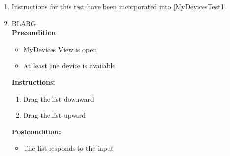 \documentclass[a4paper]{article}
\newlength{\testlabellength}
\newenvironment{testlist}{\begin{enumerate}[label=\bfseries Instruction \thesubsection.\arabic* , labelindent=0pt, labelwidth=\testlabellength , leftmargin=2cm]}{\end{enumerate}}
\newenvironment{precondition}{
{\color{white}BLARG}\\ 
\textbf{Precondition}
\begin{itemize}[labelindent=0cm, labelwidth=2cm , leftmargin=1cm]
}
{\end{itemize}}
\newenvironment{instruction}{
\textbf{Instructions:}
\begin{enumerate}[label=\bfseries  \arabic*., labelindent=0cm, labelwidth=2cm , leftmargin=1cm]
}
{\end{enumerate}}
\newenvironment{postcondition}{
\textbf{Postcondition:}
\begin{itemize}[labelindent=0cm, labelwidth=2cm , leftmargin=1cm]
}
{\end{itemize}}
\begin{document}
\begin{appendices}
\begin{testlist}
	\item
		Instructions for this test have been incorporated into \ref{MyDevicesTest1}
    


    \item	
    	\begin{precondition}
    		\item MyDevices View is open
    		\item At least one device is available
    	\end{precondition}
    	\begin{instruction}
			\item Drag the list downward
			\item Drag the list upward
		\end{instruction}
		\begin{postcondition}
			\item The list responds to the input
		\end{postcondition}
   

\end{testlist}
\end{appendices}
\end{document}
